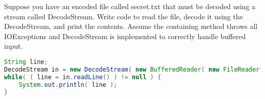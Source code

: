 Suppose you have an encoded file called secret.txt that must be decoded using a stream called DecodeStream.  
Write code to read the file, decode it using the DecodeStream, and print the contents.  
Assume the containing method throws all IOExceptions and DecodeStream is implemented to correctly handle buffered input.

\begin{answer}
\begin{lstlisting}[language=java]
String line;
DecodeStream in = new DecodeStream( new BufferedReader( new FileReader( "secret.txt" ) ) );
while( ( line = in.readLine() ) != null ) {
	System.out.println( line );
}
\end{lstlisting}
\end{answer}

\vspace{24pt}
